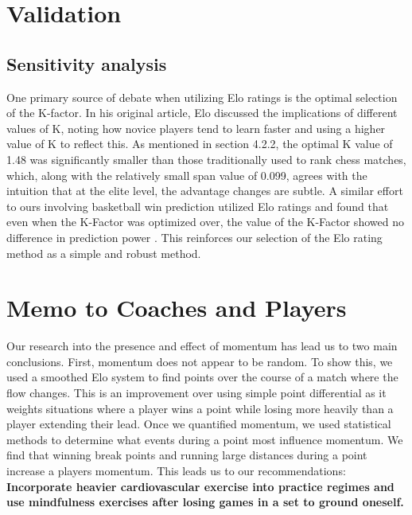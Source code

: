 \documentclass[letterpaper, 12pt]{article}
\begin{document}
        
    \section{Validation}

        \subsection{Sensitivity analysis} \label{sec:Sensitivity_Analysis}

            One primary source of debate when utilizing Elo ratings is the optimal selection of the K-factor. In his original article, Elo discussed the implications of different values of K, noting how novice players tend to learn faster and using a higher value of K to reflect this. As mentioned in section 4.2.2, the optimal K value of 1.48 was significantly smaller than those traditionally used to rank chess matches, which, along with the relatively small span value of 0.099, agrees with the intuition that at the elite level, the advantage changes are subtle. A similar effort to ours involving basketball win prediction utilized Elo ratings and found that even when the K-Factor was optimized over, the value of the K-Factor showed no difference in prediction power \cite{Dobson2019}. This reinforces our selection of the Elo rating method as a simple and robust method.

    \section{Memo to Coaches and Players}
    
        Our research into the presence and effect of momentum has lead us to two main conclusions. First, momentum does not appear to be random. To show this, we used a smoothed Elo system to find points over the course of a match where the flow changes. This is an improvement over using simple point differential as it weights situations where a player wins a point while losing more heavily than a player extending their lead. Once we quantified momentum, we used statistical methods to determine what events during a point most influence momentum. We find that winning break points and running large distances during a point increase a players momentum. This leads us to our recommendations: \textbf{Incorporate heavier cardiovascular exercise into practice regimes and use mindfulness exercises after losing games in a set to ground oneself.}
        
\end{document}
